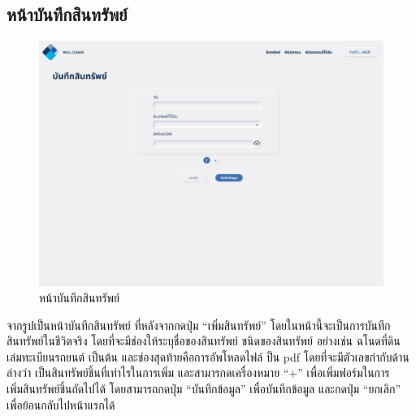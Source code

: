 \documentclass[12pt,oneside,openright,a4paper]{cpe-thai-project}
\begin{document}
\subsection{หน้าบันทึกสินทรัพย์}
		\begin{figure}[!thb]
			\centering
			\includegraphics[scale=0.2]{saveAsset}
			\caption{หน้าบันทึกสินทรัพย์}
		\end{figure}
		\FloatBarrier
		\tab จากรูปเป็นหน้าบันทึกสินทรัพย์ ที่หลังจากกดปุ่ม “เพิ่มสินทรัพย์” โดยในหน้านี้จะเป็นการบันทึกสินทรัพย์ในชีวิตจริง โดยที่จะมีช่องให้ระบุชื่อของสินทรัพย์  ชนิดของสินทรัพย์ อย่างเช่น ฉโนดที่ดิน เล่มทะเบียนรถยนต์ เป็นต้น และช่องสุดท้ายคือการอัพโหลดไฟล์ ป็น pdf โดยที่จะมีตัวเลขกำกับด้านล่างว่า เป็นสินทรัพย์ชิ้นที่เท่าไรในการเพิ่ม และสามารกดเครื่องหมาย “+” เพื่อเพิ่มฟอร์มในการเพิ่มสินทรัพย์ชิ้นถัดไปได้ โดยสามารถกดปุ่ม “บันทึกข้อมูล” เพื่อบันทึกข้อมูล และกดปุ่ม “ยกเลิก” เพื่อย้อนกลับไปหน้าแรกได้
\end{document}
